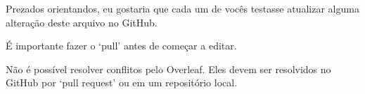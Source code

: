 \documentclass{article}
\begin{document}
Prezados orientandos,
eu gostaria que cada um de vocês testasse atualizar alguma alteração deste arquivo no GitHub.

É importante fazer o `pull' antes de começar a editar.

Não é possível resolver conflitos pelo Overleaf.
Eles devem ser resolvidos no GitHub por `pull request' ou em um repositório local.
\end{document}
